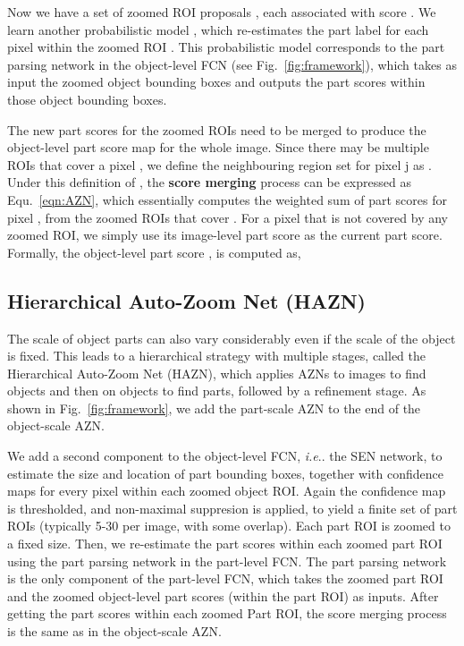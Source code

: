 \documentclass[runningheads]{llncs}
\makeatletter
\DeclareRobustCommand\onedot{\futurelet\@let@token\@onedot}
\def\@onedot{\ifx\@let@token.\else.\null\fi\xspace}
\def\ie{\emph{i.e}\onedot} \def\Ie{\emph{I.e}\onedot}
\makeatother
\begin{document}
Now we have a set of zoomed ROI proposals , each  associated with score . We learn another probabilistic model , which re-estimates the part label for each pixel  within the zoomed ROI . This probabilistic model corresponds to the part parsing network in the object-level FCN (see Fig.~\ref{fig:framework}), which takes as input the zoomed object bounding boxes and outputs the part scores within those object bounding boxes.

The new part scores for the zoomed ROIs need to be merged to produce the object-level part score map for the whole image. Since there may be multiple ROIs that cover a pixel , we define the neighbouring region set for pixel j as . Under this definition of , the \textbf{score merging} process can be expressed as Equ.~\ref{eqn:AZN}, which essentially computes the weighted sum of part scores for pixel , from the zoomed ROIs that cover . For a pixel that is not covered by any zoomed ROI, we simply use its image-level part score as the current part score. Formally, the object-level part score , is computed as, 





\subsection{Hierarchical Auto-Zoom Net (HAZN)}
\vspace{-0.4\baselineskip}
\label{subsec:HAZN}
The scale of object parts can also vary considerably even if the scale of the object is fixed. This leads to a hierarchical strategy with multiple stages, called the Hierarchical Auto-Zoom Net (HAZN), which applies AZNs to images to find objects and then on objects to find parts, followed by a refinement stage. As shown in Fig.~\ref{fig:framework}, we add the part-scale AZN to the end of the object-scale AZN.

We add a second component to the object-level FCN, \ie the SEN network, to estimate the size and location of part bounding boxes, together with confidence maps for every pixel within each zoomed object ROI. Again the confidence map is thresholded, and non-maximal suppresion is applied, to yield a finite set of part ROIs (typically 5-30 per image, with some overlap). Each part ROI is zoomed to a fixed size. Then, we re-estimate the part scores within each zoomed part ROI using the part parsing network in the part-level FCN. The part parsing network is the only component of the part-level FCN, which takes the zoomed part ROI and the zoomed object-level part scores (within the part ROI) as inputs. After getting the part scores within each zoomed Part ROI, the score merging process is the same as in the object-scale AZN.
\end{document}
